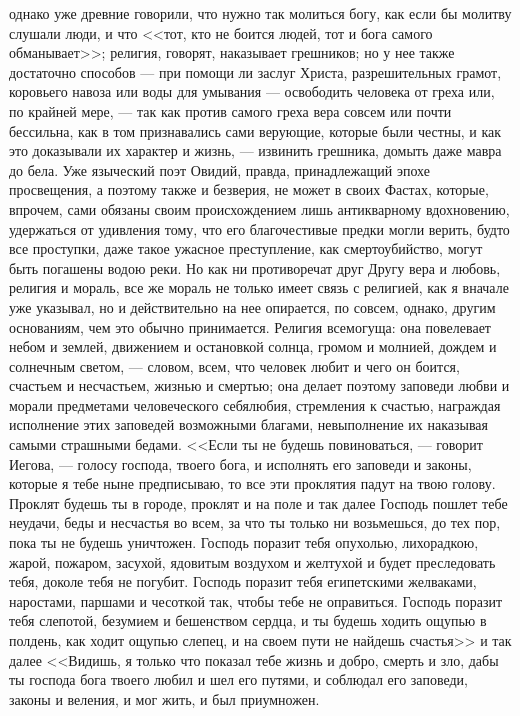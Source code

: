 \documentclass[12pt]{article}
\begin{document}
однако уже древние говорили, что нужно так молиться богу, как если бы молитву слушали люди, и что <<тот, кто не боится людей, тот и бога самого обманывает>>; религия, говорят, наказывает грешников; но у нее также достаточно способов --- при помощи ли заслуг Христа, разрешительных грамот, коровьего навоза или воды для умывания --- освободить человека от греха или, по крайней мере, --- так как против самого греха вера совсем или почти бессильна, как в том признавались сами верующие, которые были честны, и как это доказывали их характер и жизнь, --- извинить грешника, домыть даже мавра до бела. Уже языческий поэт Овидий, правда, принадлежащий эпохе просвещения, а поэтому также и безверия, не может в своих Фастах, которые, впрочем, сами обязаны своим происхождением лишь антикварному вдохновению, удержаться от удивления тому, что его благочестивые предки могли верить, будто все проступки, даже такое ужасное преступление, как смертоубийство, могут быть погашены водою реки. Но как ни противоречат друг Другу вера и любовь, религия и мораль, все же мораль не только имеет связь с религией, как я вначале уже указывал, но и действительно на нее опирается, по совсем, однако, другим основаниям, чем это обычно принимается. Религия всемогуща: она повелевает небом и землей, движением и остановкой солнца, громом и молнией, дождем и солнечным светом, --- словом, всем, что человек любит и чего он боится, счастьем и несчастьем, жизнью и смертью; она делает поэтому заповеди любви и морали предметами человеческого себялюбия, стремления к счастью, награждая исполнение этих заповедей возможными благами, невыполнение их наказывая самыми страшными бедами. <<Если ты не будешь повиноваться, --- говорит Иегова, --- голосу господа, твоего бога, и исполнять его заповеди и законы, которые я тебе ныне предписываю, то все эти проклятия падут на твою голову. Проклят будешь ты в городе, проклят и на поле и так далее Господь пошлет тебе неудачи, беды и несчастья во всем, за что ты только ни возьмешься, до тех пор, пока ты не будешь уничтожен. Господь поразит тебя опухолью, лихорадкою, жарой, пожаром, засухой, ядовитым воздухом и желтухой и будет преследовать тебя, доколе тебя не погубит. Господь поразит тебя египетскими желваками, наростами, паршами и чесоткой так, чтобы тебе не оправиться. Господь поразит тебя слепотой, безумием и бешенством сердца, и ты будешь ходить ощупью в полдень, как ходит ощупью слепец, и на своем пути не найдешь счастья>> и так далее <<Видишь, я только что показал тебе жизнь и добро, смерть и зло, дабы ты господа бога твоего любил и шел его путями, и соблюдал его заповеди, законы и веления, и мог жить, и был приумножен. 
\end{document}

